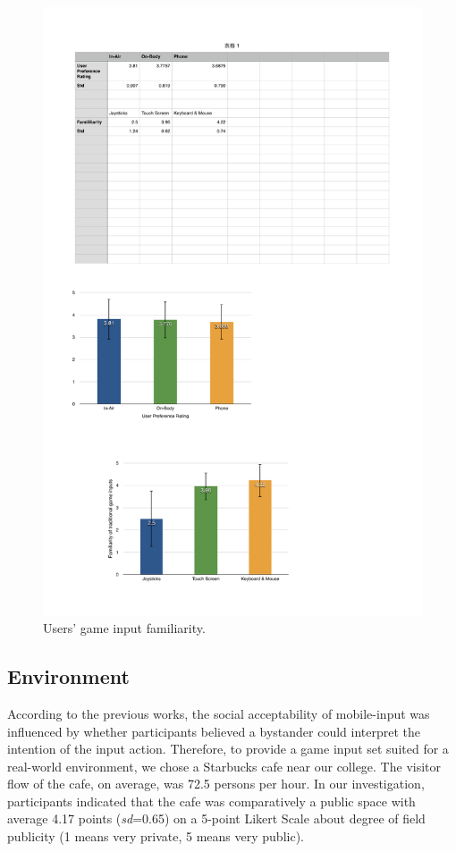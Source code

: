 \documentclass{sigchi}
\begin{document}
  \begin{figure}[!h]
  \centering
  \includegraphics[width=1\columnwidth]{Familiarity.pdf}
  \caption{Users' game input familiarity.}
  \label{fig:figureFamiliarity}
  \end{figure}   

  \subsection {Environment}
  According to the previous works\cite{Wiliamson:2011:MMI:2070481.2070551,Williamson:2013:MEM:2522848.2522874,Montero:2010:YUS:1851600.1851647,Rico:2010:UGM:1753326.1753458}, the social acceptability of mobile-input was influenced by whether participants believed a bystander could interpret the intention of the input action. Therefore, to provide a game input set suited for a real-world environment, we chose a Starbucks cafe near our college. The visitor flow of the cafe, on average, was 72.5 persons per hour. In our investigation, participants indicated that the cafe was comparatively a public space with average 4.17 points (\textsl{sd}=0.65) on a 5-point Likert Scale about degree of field publicity (1 means very private, 5 means very public).    
\end{document}
